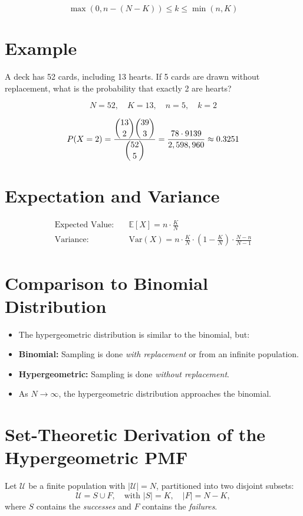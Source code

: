 \documentclass[12pt]{article}
\begin{document}
\[
\max(0, n - (N-K)) \leq k \leq \min(n, K)
\]

\section*{Example}

A deck has 52 cards, including 13 hearts. If 5 cards are drawn without replacement, what is the probability that exactly 2 are hearts?

\[
N = 52,\quad K = 13,\quad n = 5,\quad k = 2
\]

\[
P(X = 2) = \frac{\dbinom{13}{2} \dbinom{39}{3}}{\dbinom{52}{5}} = \frac{78 \cdot 9139}{2,598,960} \approx 0.3251
\]

\section*{Expectation and Variance}

\begin{align*}
\text{Expected Value:} \quad & \mathbb{E}[X] = n \cdot \frac{K}{N} \\
\text{Variance:} \quad & \text{Var}(X) = n \cdot \frac{K}{N} \cdot \left(1 - \frac{K}{N} \right) \cdot \frac{N - n}{N - 1}
\end{align*}

\section*{Comparison to Binomial Distribution}

\begin{itemize}
    \item The hypergeometric distribution is similar to the binomial, but:
    \item \textbf{Binomial:} Sampling is done \emph{with replacement} or from an infinite population.
    \item \textbf{Hypergeometric:} Sampling is done \emph{without replacement}.
    \item As $N \to \infty$, the hypergeometric distribution approaches the binomial.
\end{itemize}

\section*{Set-Theoretic Derivation of the Hypergeometric PMF}

Let $\mathcal{U}$ be a finite population with $|\mathcal{U}| = N$, partitioned into two disjoint subsets:
\[
\mathcal{U} = S \cup F, \quad \text{with } |S| = K, \quad |F| = N - K,
\]
where $S$ contains the \textit{successes} and $F$ contains the \textit{failures}.
\end{document}
